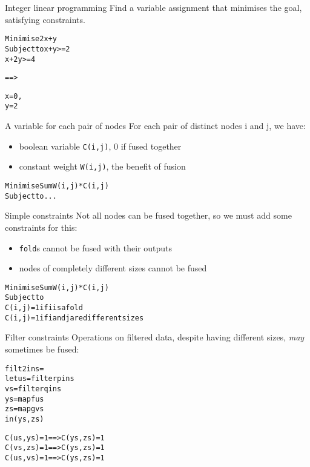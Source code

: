 \documentclass{beamer}
\newcommand{\bl}[1]{\textcolor[rgb]{0.0,0.5,0.9}{#1}}
\newcommand{\g}[1]{\textcolor[rgb]{0.7,0.3,0.3}{#1}}
\newcommand{\fr}[1]{\begin{frame}[fragile]{#1}}
\begin{document}
\fr{Integer linear programming}
Find a variable assignment that minimises the goal, satisfying constraints.
\begin{alltt}
Minimise   2x +  y
Subject to  x +  y   >= 2
            x + 2y   >= 4

==>

x = 0,
y = 2
\end{alltt}
\end{frame}


\fr{A variable for each pair of nodes}
For each pair of distinct nodes \bl{i} and \bl{j}, we have:
\begin{itemize}
\item
boolean variable \bl{\tt C(i,j)}, 0 if fused together
\item
constant weight \bl{\tt W(i,j)}, the benefit of fusion
\end{itemize}

\begin{alltt}
Minimise   Sum \bl{W(i,j)} * \bl{C(i,j)}
Subject to ...
\end{alltt}
\end{frame}

\fr{Simple constraints}
Not all nodes can be fused together, so we must add some constraints for this:
\begin{itemize}
\item
\g{\tt fold}s cannot be fused with their outputs
\item
nodes of completely different sizes cannot be fused
\end{itemize}

\begin{alltt}
Minimise   Sum \bl{W(i,j)} * \bl{C(i,j)}
Subject to
           \bl{C(i,j)} = 1 if \bl{i} is a \g{fold}
           \bl{C(i,j)} = 1 if \bl{i} and \bl{j} are different sizes
\end{alltt}
\end{frame}


\fr{Filter constraints}
Operations on filtered data, despite having different sizes, \emph{may} sometimes be fused:

\begin{alltt}
filt2 \bl{ins} =
 let \bl{us} = \g{filter} p \bl{ins}
     \bl{vs} = \g{filter} q \bl{ins}
     \bl{ys} = \g{map}    f \bl{us}
     \bl{zs} = \g{map}    g \bl{vs}
 in (\bl{ys}, \bl{zs})

           \bl{C(us,ys)} = 1 ==> \bl{C(ys,zs)} = 1
           \bl{C(vs,zs)} = 1 ==> \bl{C(ys,zs)} = 1
           \bl{C(us,vs)} = 1 ==> \bl{C(ys,zs)} = 1
\end{alltt}
\end{frame}
\end{document}
